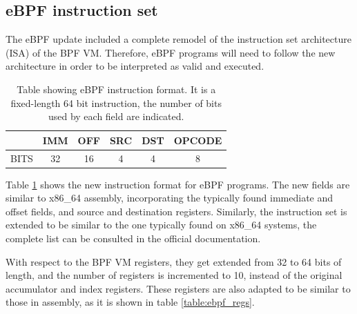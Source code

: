 \documentclass[12pt]{report} %
\begin{document}
\subsection{eBPF instruction set} \label{subsection:ebpf_inst_set}
The eBPF update included a complete remodel of the instruction set architecture (ISA) of the BPF VM. Therefore, eBPF programs will need to follow the new architecture in order to be interpreted as valid and executed.

\begin{table}[H]
\begin{tabular}{|c|c|c|c|c|c|}
\hline
& IMM & OFF & SRC & DST & OPCODE \\
\hline
BITS & 32 & 16 & 4 & 4 & 8\\
\hline
\end{tabular}
\caption{Table showing eBPF instruction format. It is a fixed-length 64 bit instruction, the number of bits used by each field are indicated.}
\label{table:ebpf_inst_format}
\end{table}


Table \ref{table:ebpf_inst_format} shows the new instruction format for eBPF programs\cite{ebpf_inst_set}. The new fields are similar to x86\_64 assembly, incorporating the typically found immediate and offset fields, and source and destination registers\cite{8664_inst_set_specs}. Similarly, the instruction set is extended to be similar to the one typically found on x86\_64 systems, the complete list can be consulted in the official documentation\cite{ebpf_inst_set}.

With respect to the BPF VM registers, they get extended from 32 to 64 bits of length, and the number of registers is incremented to 10, instead of the original accumulator and index registers. These registers are also adapted to be similar to those in assembly, as it is shown in table \ref{table:ebpf_regs}.
\end{document}
